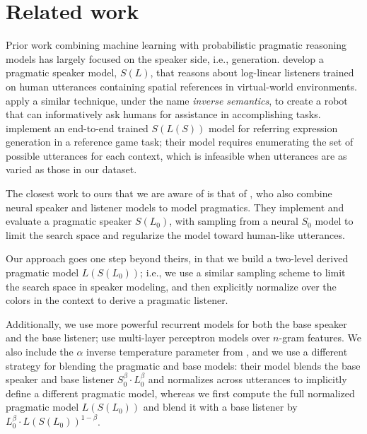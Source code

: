 \documentclass[11pt,letterpaper]{article}
\newcommand{\term}{\textit}
\newcommand{\Listener}{L}
\newcommand{\Speaker}{S}
\renewcommand{\|}{\mid}
\begin{document}
\section{Related work}

Prior work combining machine learning with probabilistic pragmatic reasoning
models has largely focused on the speaker side, i.e., generation.
 develop a pragmatic speaker model,
$\Speaker(\Listener)$, that reasons about log-linear listeners trained on human
utterances containing spatial references in virtual-world environments.
 apply a similar technique, under the name
\term{inverse semantics}, to create a robot that can informatively ask
humans for assistance in accomplishing tasks.  implement
an end-to-end trained $\Speaker(\Listener(\Speaker))$ model for referring
expression generation in a reference game task; their model requires enumerating
the set of possible utterances for each context, which is infeasible when
utterances are as varied as those in our dataset.

The closest work to ours that we are aware of is that of
, who also combine neural speaker
and listener models to model pragmatics. They implement and evaluate a
pragmatic speaker $\Speaker(\Listener_0)$, with sampling from a neural
$\Speaker_0$ model to limit the search space and regularize the model toward
human-like utterances.

Our approach goes one step beyond theirs, in that we build a two-level derived
pragmatic model $\Listener(\Speaker(\Listener_0))$; i.e., we use a similar sampling
scheme to limit the search space in speaker modeling, and then explicitly normalize
over the colors in the context to derive a pragmatic listener.

Additionally, we use more powerful recurrent models for both the base speaker and the
base listener;  use multi-layer perceptron
models over $n$-gram features. We also include the $\alpha$ inverse temperature
parameter from , and we use a different strategy for blending the
pragmatic and base models: their model blends the base speaker and base listener
$\Speaker_0^{\beta} \cdot \Listener_0^{\beta}$ and
normalizes across utterances to implicitly define a different pragmatic model,
whereas we first compute the full normalized pragmatic
model $\Listener(\Speaker(\Listener_0))$ and blend it with a base listener by
$\Listener_0^{\beta} \cdot \Listener(\Speaker(\Listener_0))^{1 - \beta}$.
\end{document}
